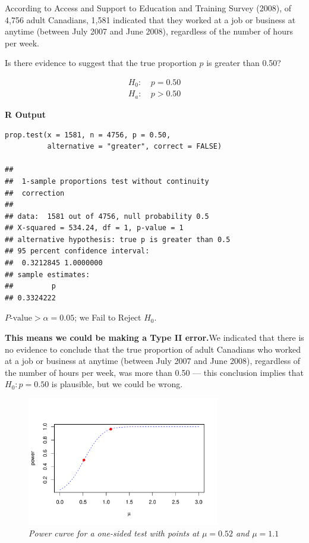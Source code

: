 \begin{example}
According to Access and Support to Education and Training Survey (2008), of 4,756 adult Canadians, 1,581 indicated that they worked at a job or business at anytime (between July 2007 and June 2008), regardless of the number of hours per week.

Is there evidence to suggest that the true proportion $p$ is greater than 0.50?

\begin{align*}
H_0\!:&\ p = 0.50 \\
H_a\!:&\ p > 0.50
\end{align*}


\noindent\textbf{R Output}
\begin{tcolorbox}[colback=gray!10, colframe=black!45, arc=2mm]
\begin{verbatim}
prop.test(x = 1581, n = 4756, p = 0.50,
          alternative = "greater", correct = FALSE)

## 
##  1-sample proportions test without continuity
##  correction
## 
## data:  1581 out of 4756, null probability 0.5
## X-squared = 534.24, df = 1, p-value = 1
## alternative hypothesis: true p is greater than 0.5
## 95 percent confidence interval:
##  0.3212845 1.0000000
## sample estimates:
##         p 
## 0.3324222 
\end{verbatim}
\end{tcolorbox}


\textbf{$P\text{-value} > \alpha = 0.05$}; we Fail to Reject $H_0$.

\textbf{This means we could be making a Type II error.}We indicated that there is no evidence to conclude that the true proportion of adult Canadians who worked at a job or business at anytime (between July 2007 and June 2008), regardless of the number of hours per week, was more than 0.50 — this conclusion implies that $H_0: p = 0.50$ is plausible, but we could be wrong.
\begin{figure}[H]  %
\centering
\includegraphics[width=0.75\textwidth]{section13/images/power_curve.pdf}
\vspace{-10pt}  %
\caption{\textit{Power curve for a one-sided test with points at $\mu = 0.52$ and $\mu = 1.1$}}
\end{figure}

\end{example}
